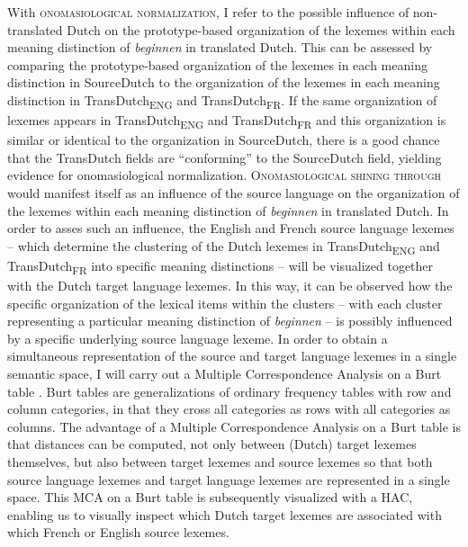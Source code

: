 With \textsc{onomasiological normalization,} I refer to the possible influence of non-translated Dutch on the prototype-based organization of the lexemes within each meaning distinction of \textit{beginnen} in translated Dutch. This can be assessed by comparing the prototype-based organization of the lexemes in each meaning distinction in SourceDutch to the organization of the lexemes in each meaning distinction in TransDutch\textsubscript{ENG} and TransDutch\textsubscript{FR}. If the same organization of lexemes appears in TransDutch\textsubscript{ENG} and TransDutch\textsubscript{FR} and this organization is similar or identical to the organization in SourceDutch, there is a good chance that the TransDutch fields are ``conforming'' to the SourceDutch field, yielding evidence for onomasiological normalization. \textsc{Onomasiological shining through} would manifest itself as an influence of the source language on the organization of the lexemes within each meaning distinction of \textit{beginnen} in translated Dutch. In order to asses such an influence, the English and French source language lexemes – which determine the clustering of the Dutch lexemes in TransDutch\textsubscript{ENG} and TransDutch\textsubscript{FR} into specific meaning distinctions – will be visualized together with the Dutch target language lexemes. In this way, it can be observed how the specific organization of the lexical items within the clusters – with each cluster representing a particular meaning distinction of \textit{beginnen} – is possibly influenced by a specific underlying source language lexeme. In order to obtain a simultaneous representation of the source and target language lexemes in a single semantic space, I will carry out a Multiple Correspondence Analysis on a Burt table \citep{greenacre_simple_2006, greenacre_correspondence_2007}. Burt tables are generalizations of ordinary frequency tables with row and column categories, in that they cross all categories as rows with all categories as columns. The advantage of a Multiple Correspondence Analysis on a Burt table is that distances can be computed, not only between (Dutch) target lexemes themselves, but also between target lexemes and source lexemes so that both source language lexemes and target language lexemes are represented in a single space. This MCA on a Burt table is subsequently visualized with a HAC, enabling us to visually inspect which Dutch target lexemes are associated with which French or English source lexemes.

